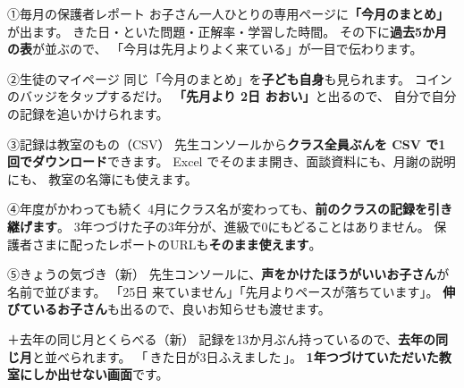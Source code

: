\documentclass[a4paper,10.5pt]{article}
\newcommand{\hl}[1]{\textbf{\color{uspeakGreen}#1}}
\begin{document}
\begin{tcbraster}[raster columns=2,raster equal height,raster row skip=4pt,
  raster column skip=6pt,raster left skip=0pt,raster right skip=0pt]
\begin{card}{①}{毎月の保護者レポート}
\small
お子さん一人ひとりの専用ページに\hl{「今月のまとめ」}が出ます。
きた日・といた問題・正解率・学習した時間。
その下に\hl{過去5か月の表}が並ぶので、
「今月は先月よりよく来ている」が一目で伝わります。
\end{card}
\begin{card}{②}{生徒のマイページ}
\small
同じ「今月のまとめ」を\hl{子ども自身}も見られます。
コインのバッジをタップするだけ。
\hl{「先月より 2日 おおい」}と出るので、
自分で自分の記録を追いかけられます。
\end{card}
\begin{card}{③}{記録は教室のもの（CSV）}
\small
先生コンソールから\hl{クラス全員ぶんを CSV で1回でダウンロード}できます。
Excel でそのまま開き、面談資料にも、月謝の説明にも、
教室の名簿にも使えます。
\end{card}
\begin{card}{④}{年度がかわっても続く}
\small
4月にクラス名が変わっても、\hl{前のクラスの記録を引き継げます}。
3年つづけた子の3年分が、進級で0にもどることはありません。
保護者さまに配ったレポートのURLも\hl{そのまま使えます}。
\end{card}
\end{tcbraster}

\vspace{4pt}

\begin{tcbraster}[raster columns=2,raster equal height,raster row skip=4pt,
  raster column skip=6pt,raster left skip=0pt,raster right skip=0pt]
\begin{card}{⑤}{きょうの気づき（新）}
\small
先生コンソールに、\hl{声をかけたほうがいいお子さん}が名前で並びます。
「25日 来ていません」「先月よりペースが落ちています」。
\hl{伸びているお子さん}も出るので、良いお知らせも渡せます。
\end{card}
\begin{card}{＋}{去年の同じ月とくらべる（新）}
\small
記録を13か月ぶん持っているので、\hl{去年の同じ月}と並べられます。
「\,きた日が3日ふえました\,」。
\hl{1年つづけていただいた教室にしか出せない画面}です。
\end{card}
\end{tcbraster}

\vspace{6pt}
\end{document}
